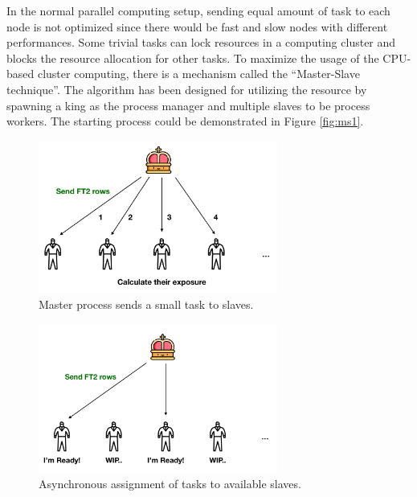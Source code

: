 In the normal parallel computing setup, sending equal
amount of task to each node is not optimized since
there would be fast and slow nodes with different performances. 
Some trivial tasks can lock resources in a
computing cluster and blocks the resource
allocation for other tasks. 
To maximize the usage of the CPU-based cluster computing, there is a 
mechanism called the ``Master-Slave technique''. The algorithm has been designed for utilizing the resource by spawning a king as the process manager 
and multiple slaves to be process workers. The starting process could 
be demonstrated in Figure \ref{fig:ms1}. 


\begin{figure}[h!]
    \centering
    \includegraphics[width=0.7\textwidth]{content/methodology/figures/ms2}
    \caption{Master process sends a small task to slaves.}
    \label{fig:ms2}
\end{figure}


\begin{figure}[h!]
    \centering
    \includegraphics[width=0.7\textwidth]{content/methodology/figures/ms3}
    \caption{Asynchronous assignment of tasks to available slaves.}
    \label{fig:ms3}
\end{figure}

